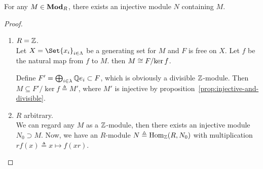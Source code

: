 \begin{theorem} \label{thm:every-module-is-in-injective-module}
 For any $M \in \mathbf{Mod}_R$, there exists an injective module $N$ containing $M$.
 \begin{proof} $ $
   \begin{enumerate}[label={\bf Case \arabic*:}]
      \item $R = \mathbb{Z}$. \\
        Let $X = \Set{x_i}_{i \in \Lambda}$ be a generating set for $M$
        and $F$ is free on $X$. Let $f$ be the natural map from $f$
        to $M$. then $M \cong {F}/{\ker f}$.

        Define $F' = \bigoplus_{i \in \lambda} \mathbb{Q} e_i \subset F$,
        which is obviously a divisible $\mathbb{Z}$-module.
        Then $M \subseteq F' / \ker f \triangleq M'$,
        where $M'$ is injective by proposition~\ref{prop:injective-and-divisible}.

      \item $R$ arbitrary. \\
        We can regard any $M$ as a $\mathbb{Z}$-module, then there exists an injective
        module $N_0 \supset M$.
        Now, we have an $R$-module $N \triangleq \operatorname{Hom}_{\mathbb{Z}}(R, N_0)$
        with multiplication $r f(x) \triangleq x \mapsto f(x r)$.


\end{enumerate}
\end{proof}
\end{theorem}
